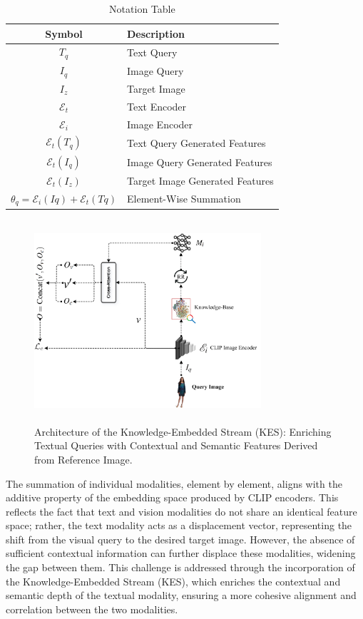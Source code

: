 \documentclass[10pt,lineno]{wlpeerj}
\begin{document}
\begin{table}[h!]
\small
\centering
\begin{tabular}{|c|l|}
\hline
Symbol & Description \\ \hline
 $T_q$ & Text Query \\ \hline
 $I_q$ & Image Query \\ \hline
 $I_z$ & Target Image \\ \hline
 $\mathcal{E}_t$ & Text Encoder \\ \hline
 $\mathcal{E}_i$ & Image Encoder \\ \hline
 $\mathcal{E}_t(T_q)$ & Text Query Generated Features \\ \hline
 $\mathcal{E}_t(I_q)$ & Image Query Generated Features \\ \hline
 $\mathcal{E}_t(I_z)$ & Target Image Generated Features \\ \hline
 $\theta_q  = \mathcal{E}_i(Iq) + \mathcal{E}_t(Tq)$ & Element-Wise Summation \\ \hline
 \end{tabular}
\caption{Notation Table}
\label{tab:notation_table_fig2}
\end{table}
\FloatBarrier
\begin{figure}[t]
    \centering      \includegraphics[width=0.75\textwidth,height=75mm]{KES.jpg}
        \caption{Architecture of the Knowledge-Embedded Stream (KES): Enriching Textual Queries with Contextual and Semantic Features Derived from Reference Image.}
    \label{fig:KES}
\end{figure}
% 
\FloatBarrier

The summation of individual modalities, element by element, aligns with the additive property of the embedding space produced by CLIP encoders. This reflects the fact that text and vision modalities do not share an identical feature space; rather, the text modality acts as a displacement vector, representing the shift from the visual query to the desired target image. However, the absence of sufficient contextual information can further displace these modalities, widening the gap between them. This challenge is addressed through the incorporation of the Knowledge-Embedded Stream (KES), which enriches the contextual and semantic depth of the textual modality, ensuring a more cohesive alignment and correlation between the two modalities.
\end{document}
